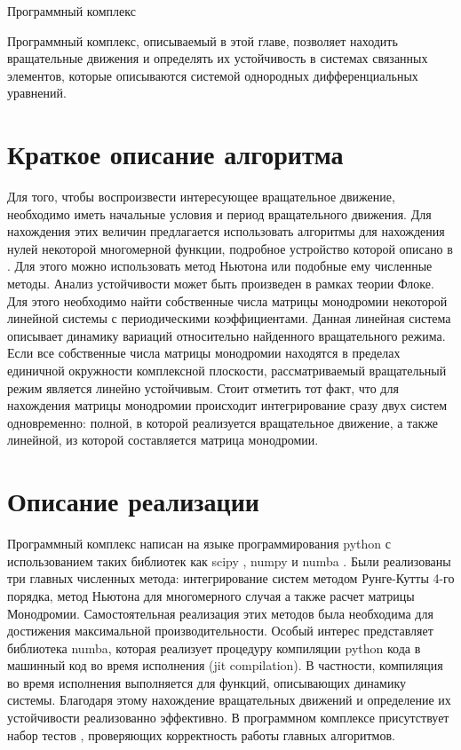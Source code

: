 \begin{chapter}{Программный комплекс}

	Программный комплекс, описываемый в этой главе, позволяет находить вращательные движения и
	определять их устойчивость в системах связанных элементов, которые описываются системой однородных
	дифференциальных уравнений.

\section{Краткое описание алгоритма}
	Для того, чтобы воспроизвести интересующее вращательное движение, необходимо иметь
	начальные условия и период вращательного движения. Для нахождения этих величин предлагается использовать
	алгоритмы для нахождения нулей некоторой многомерной функции, подробное устройство которой описано в \cite{Khorkin}.
	Для этого можно использовать метод Ньютона или подобные ему численные методы.
	Анализ устойчивости может быть произведен в рамках теории Флоке. Для этого необходимо найти
	собственные числа матрицы монодромии некоторой линейной системы с периодическими коэффициентами.
	Данная линейная система описывает динамику вариаций относительно найденного вращательного режима. Если все собственные числа матрицы монодромии находятся в пределах
	единичной окружности комплексной плоскости, рассматриваемый вращательный режим является линейно устойчивым.
	Стоит отметить тот факт, что для нахождения матрицы монодромии происходит интегрирование сразу двух систем одновременно:
	полной, в которой реализуется вращательное движение, а также линейной, из которой составляется матрица монодромии.  
\section{Описание реализации}
Программный комплекс написан на языке программирования python с использованием таких
библиотек как scipy \cite{scipy}, numpy \cite{numpy} и numba \cite{numba}.
Были реализованы три главных численных метода: интегрирование систем методом Рунге-Кутты 4-го порядка, метод Ньютона для
многомерного случая а также расчет матрицы Монодромии. Самостоятельная реализация этих методов была необходима для достижения 
максимальной производительности. 
Особый интерес представляет библиотека numba, которая реализует процедуру 
компиляции python кода в машинный код во время исполнения (jit compilation).
В частности, компиляция во время исполнения выполняется для функций, описывающих динамику системы.
Благодаря этому нахождение вращательных движений и определение их устойчивости реализованно эффективно.
В программном комплексе присутствует набор тестов \cite{testing}, проверяющих корректность работы главных алгоритмов.


\end{chapter}
